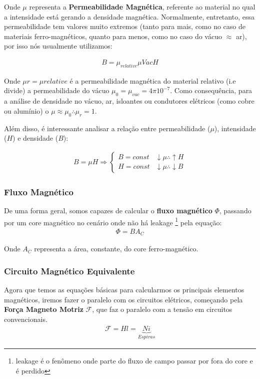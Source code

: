\documentclass{article}
\begin{document}
Onde $\mu$ representa a \textbf{Permeabilidade Magnética}, referente ao material no qual a intensidade está gerando a densidade magnética. Normalmente, entretanto, essa permeabilidade tem valores muito extremos (tanto para mais, como no caso de materiais ferro-magnéticos, quanto para menos, como no caso do vácuo $\approx$ ar), por isso nós usualmente utilizamos:

\begin{align}
    B = \mu_{relative} \mu{Vac} H
\end{align}

Onde $\mu{r} = \mu{relative}$ é a permeabilidade magnética do material relativo (i.e divide) a permeabilidade do vácuo $\mu_{0} = \mu_{vac} = 4\pi 10^{-7}$. Como consequência, para a análise de densidade no vácuo, ar, isloantes ou condutores elétricos (como cobre ou alumínio) o $\mu \approx \mu_0 \therefore \mu_r = 1$.

Além disso, é interessante analisar a relação entre permeabilidade ($\mu$), intensidade ($H$) e densidade ($B$):

\begin{align*}
    B = \mu H \Rightarrow \begin{cases}
        B = const & \downarrow \mu \therefore \uparrow H \\ 
        H = const & \downarrow \mu \therefore \downarrow B
    \end{cases}
\end{align*}

\subsubsection{Fluxo Magnético}

De uma forma geral, somos capazes de calcular o \textbf{fluxo magnético} $\Phi$, passando por um core magnético no cenário onde não há leakage \footnote{leakage é o fenômeno onde parte do fluxo de campo passar por fora do core e é perdido} pela equação:
\begin{align}
    \Phi = B A_C
\end{align}

Onde $A_C$ representa a área, constante, do core ferro-magnético.


\subsubsection{Circuito Magnético Equivalente}
Agora que temos as equações básicas para calcularmos os principais elementos magnéticos, iremos fazer o paralelo com os circuitos elétricos, começando pela  \textbf{Força Magneto Motriz} $\mathcal{F}$, que faz o paralelo com a tensão em circuitos convencionais.
\begin{align}
    \mathcal{F} = Hl = \underbrace{Ni}_{Espiras}
\end{align}
\end{document}
